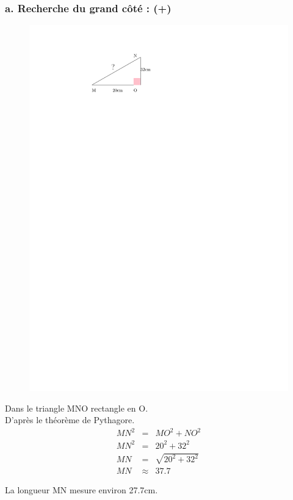 \documentclass[12pt]{article}
\begin{document}
\begin{multicols}{2}

	\subsubsection*{a. Recherche du grand côté : (+)}

	\begin{figure}[H]
		\centering
		\includegraphics[width=0.5\linewidth]{3x6-pythagore/sources/re-h.pdf}
	\end{figure}

	Dans le triangle MNO rectangle en O.\\
	D'après le théorème de Pythagore.
	\begin{eqnarray*}
		MN^2 &=& MO^2 + NO^2 \\
		MN^2 &=& 20^2 + 32^2 \\
		MN   &=& \sqrt{20^2 + 32^2} \\
		MN   &\approx& 37.7
	\end{eqnarray*}

	La longueur MN mesure environ 27.7cm.

\end{multicols}
\end{document}
